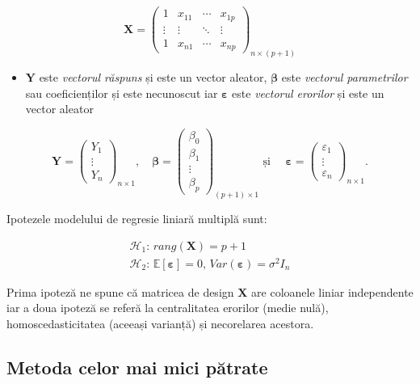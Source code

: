 \documentclass[]{article}
\providecommand{\tightlist}{%
  \setlength{\itemsep}{0pt}\setlength{\parskip}{0pt}}
\begin{document}
\[
\mathbf{X}=\begin{pmatrix}
1 & x_{11} & \cdots & x_{1p}\\
\vdots & \vdots & \ddots & \vdots\\
1 & x_{n1} & \cdots & x_{np}
\end{pmatrix}_{n\times(p+1)}
\]

\begin{itemize}
\tightlist
\item
  \(\mathbf{Y}\) este \emph{vectorul răspuns} și este un vector aleator,
  \(\boldsymbol\beta\) este \emph{vectorul parametrilor} sau
  coeficienților și este necunoscut iar \(\boldsymbol\varepsilon\) este
  \emph{vectorul erorilor} și este un vector aleator
\end{itemize}

\[
\mathbf{Y}=\begin{pmatrix}
Y_1 \\
\vdots \\
Y_n
\end{pmatrix}_{n\times 1},\quad\boldsymbol\beta=\begin{pmatrix}
\beta_0 \\
\beta_1 \\
\vdots \\
\beta_p
\end{pmatrix}_{(p+1)\times 1}\text{ și }\quad
\boldsymbol\varepsilon=\begin{pmatrix}
\varepsilon_1 \\
\vdots \\
\varepsilon_n
\end{pmatrix}_{n\times 1}.
\]

Ipotezele modelului de regresie liniară multiplă sunt:

\[
  \begin{array}{ll}
    \mathcal{H}_1: \, rang(\boldsymbol X) = p+1\\
    \mathcal{H}_2: \, \mathbb{E}[\boldsymbol \varepsilon] = 0,\, Var(\boldsymbol \varepsilon) = \sigma^2 I_n
  \end{array}
\]

Prima ipoteză ne spune că matricea de design \(\boldsymbol X\) are
coloanele liniar independente iar a doua ipoteză se referă la
centralitatea erorilor (medie nulă), homoscedasticitatea (aceeași
varianță) și necorelarea acestora.

\hypertarget{metoda-celor-mai-mici-patrate}{%
\subsection{Metoda celor mai mici
pătrate}\label{metoda-celor-mai-mici-patrate}}
\end{document}
